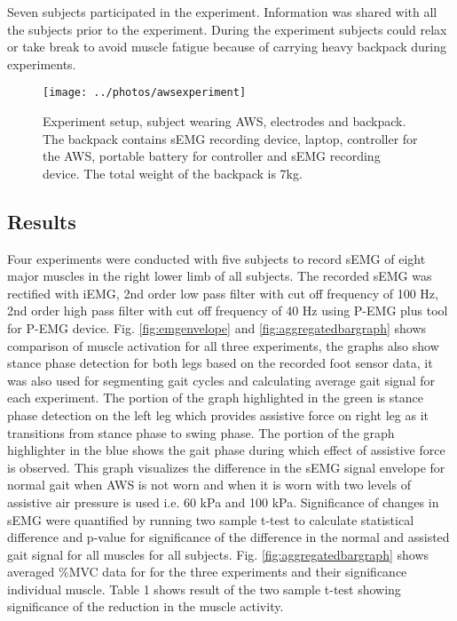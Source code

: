 \documentclass[letterpaper, 10 pt, conference]{ieeeconf}  %
\begin{document}
Seven subjects participated in the experiment. Information was shared with all the subjects prior to the experiment. During the experiment subjects could relax or take break to avoid muscle fatigue because of carrying heavy backpack during experiments.


\begin{figure}
	\centering
	\texttt{[image: ../photos/awsexperiment]}
	\caption{Experiment setup, subject wearing AWS, electrodes and backpack. The backpack contains sEMG recording device, laptop, controller for the AWS, portable battery for controller and sEMG recording device. The total weight of the backpack is 7kg.}
	\label{fig:experimentsetup}
\end{figure}

\subsection{Results}

Four experiments were conducted with five subjects to record sEMG of eight major muscles in the right lower limb of all subjects. The recorded sEMG was rectified with iEMG, 2nd order low pass filter with cut off frequency of 100 Hz, 2nd order high pass filter with cut off frequency of 40 Hz using P-EMG plus tool for P-EMG device. Fig. \ref{fig:emgenvelope} and \ref{fig:aggregatedbargraph} shows comparison of muscle activation for all three experiments, the graphs also show stance phase detection for both legs based on the recorded foot sensor data, it was also used for segmenting gait cycles and calculating average gait signal for each experiment.  The portion of the graph highlighted in the green is stance phase detection on the left leg which provides assistive force on right leg as it transitions  from stance phase to swing phase. The portion of the graph highlighter in the blue shows the gait phase during which effect of assistive force is observed. This graph visualizes the difference in the sEMG signal envelope for normal gait when AWS is not worn and when it is worn with two levels of assistive air pressure is used i.e. 60 kPa and 100 kPa. Significance of  changes in sEMG were quantified by running two sample t-test to calculate statistical difference and p-value for significance of the difference in the normal and assisted gait signal for all muscles for all subjects. Fig. \ref{fig:aggregatedbargraph} shows averaged \%MVC data for  for the three experiments and their significance individual muscle. Table 1 shows result of the two sample t-test showing significance of the reduction in the muscle activity.
\end{document}
